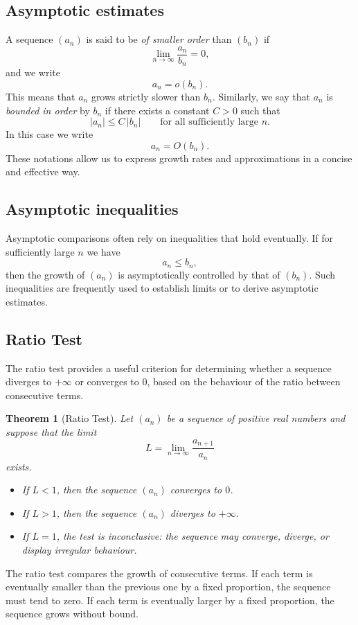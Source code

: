 \documentclass[11pt,a4paper]{article}
\theoremstyle{definition} \newtheorem{definition}{Definition} \theoremstyle{plain} \newtheorem{theorem}{Theorem}
\begin{document}
\subsection*{Asymptotic estimates}
A sequence $(a_n)$ is said to be \emph{of smaller order} than $(b_n)$ if
\[ \lim_{n\to\infty} \frac{a_n}{b_n} = 0, \]
and we write
\[ a_n = o(b_n). \]
This means that $a_n$ grows strictly slower than $b_n$.
Similarly, we say that $a_n$ is \emph{bounded in order} by $b_n$ if there exists a constant $C>0$ such that
\[ |a_n| \le C\,|b_n| \qquad \text{for all sufficiently large } n. \]
In this case we write
\[ a_n = O(b_n). \]
These notations allow us to express growth rates and approximations in a concise and effective way.
\subsection*{Asymptotic inequalities}
Asymptotic comparisons often rely on inequalities that hold eventually.
If for sufficiently large $n$ we have
\[ a_n \le b_n, \]
then the growth of $(a_n)$ is asymptotically controlled by that of $(b_n)$. Such inequalities are frequently used to establish limits or to derive asymptotic estimates.
\subsection{Ratio Test}
The ratio test provides a useful criterion for determining whether a sequence diverges to $+\infty$ or converges to $0$, based on the behaviour of the ratio between consecutive terms.
\begin{theorem}[Ratio Test]\label{thm:ratio-test-limits} Let $(a_n)$ be a sequence of positive real numbers and suppose that the limit
\[ L = \lim_{n\to\infty} \frac{a_{n+1}}{a_n} \]
exists.
\begin{itemize}
\item If $L < 1$, then the sequence $(a_n)$ converges to $0$.
\item If $L > 1$, then the sequence $(a_n)$ diverges to $+\infty$.
\item If $L = 1$, the test is inconclusive: the sequence may converge, diverge,
or display irregular behaviour. \end{itemize} \end{theorem}
The ratio test compares the growth of consecutive terms.
If each term is eventually smaller than the previous one by a fixed proportion, the sequence must tend to zero.
If each term is eventually larger by a fixed proportion, the sequence grows without bound.
\end{document}
